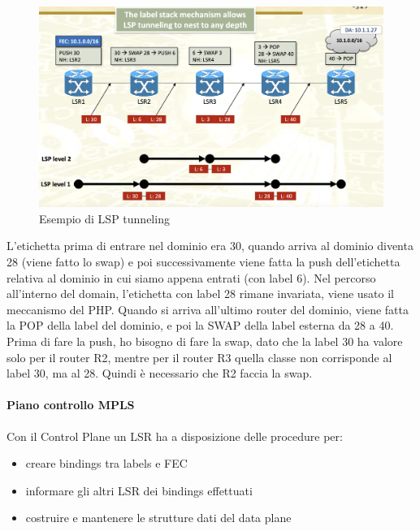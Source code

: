 \documentclass{article}
\begin{document}
\begin{figure}[H]
    \centering
    \includegraphics[scale=0.3]{figures/tunneling example mpls.png}
    \caption{Esempio di LSP tunneling}
\end{figure}
\noindent L'etichetta prima di entrare nel dominio era 30, quando arriva al dominio diventa 28 (viene fatto lo swap) e poi successivamente viene fatta la push dell'etichetta relativa al dominio in cui siamo appena entrati (con label 6). Nel percorso all'interno del domain, l'etichetta con label 28 rimane invariata, viene usato il meccanismo del PHP. Quando si arriva all'ultimo router del dominio, viene fatta la POP della label del dominio, e poi la SWAP della label esterna da 28 a 40. Prima di fare la push, ho bisogno di fare la swap, dato che la label 30 ha valore solo per il router R2, mentre per il router R3 quella classe non corrisponde al label 30, ma al 28. Quindi è necessario che R2 faccia la swap.

\paragraph{Piano controllo MPLS} Con il Control Plane un LSR ha a disposizione delle procedure per: 
\begin{itemize}
    \item creare bindings tra labels e FEC
    \item informare gli altri LSR dei bindings effettuati
    \item costruire e mantenere le strutture dati del data plane
\end{itemize}
\end{document}
